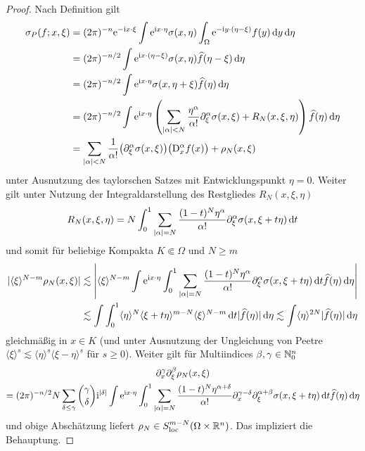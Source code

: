 \begin{proof}
Nach Definition gilt
\begin{align}
   \sigma_P(f;x,\xi) &=(2\pi)^{-n}  \mathrm e^{-\mathrm i x\cdot\xi} \int \mathrm e^{\mathrm i x\cdot\eta} \sigma(x,\eta) \int_\Omega \mathrm e^{-\mathrm i y\cdot(\eta-\xi)} f(y) \,\mathrm d y \,\mathrm d\eta \notag\\
   & = (2\pi)^{-n/2}  \int \mathrm e^{\mathrm i x\cdot(\eta-\xi)} \sigma(x,\eta) \widehat f(\eta-\xi)\,\mathrm d\eta \notag\\
   & = (2\pi)^{-n/2}  \int \mathrm e^{\mathrm i x\cdot\eta} \sigma(x,\eta+\xi) \widehat f(\eta)\,\mathrm d\eta \notag\\
   & = (2\pi)^{-n/2}  \int \mathrm e^{\mathrm i x\cdot\eta} \left( \sum_{|\alpha|<N} \frac{\eta^\alpha}{\alpha!} \partial_\xi^\alpha \sigma(x,\xi) + R_N(x,\xi,\eta) \right) \widehat f(\eta)\,\mathrm d\eta \notag\\  
   & =  \sum_{|\alpha|<N} \frac{1}{\alpha!} \big( \partial_\xi^\alpha \sigma(x,\xi) \big) \big(\mathrm D_x^\alpha f(x)\big)  +
   \rho_N(x,\xi)
\end{align}
unter Ausnutzung des taylorschen Satzes mit Entwicklungspunkt $\eta=0$. Weiter gilt unter Nutzung der Integraldarstellung des Restgliedes $R_N(x,\xi,\eta)$ 
\begin{equation}
   R_N(x,\xi,\eta) = N \int_0^1 \sum_{|\alpha|=N} \frac{(1-t)^N \eta^\alpha}{\alpha!} \partial_\xi^\alpha \sigma(x,\xi+t\eta) \,\mathrm d t 
\end{equation}
und somit für beliebige Kompakta $K\Subset\Omega$ und $N\ge m$
\begin{align}
   |\langle\xi\rangle^{N-m} \rho_N(x,\xi)|& \lesssim 
   \left|\langle\xi\rangle^{N-m}  \int \mathrm e^{\mathrm i x\cdot\eta} \int_0^1 \sum_{|\alpha|=N} \frac{(1-t)^N \eta^\alpha}{\alpha!} \partial_\xi^\alpha \sigma(x,\xi+t\eta) \,\mathrm d t  \widehat f(\eta) \,\mathrm d\eta   \right| \notag\\
&\lesssim  \int \int_0^1 \langle\eta\rangle^N \langle\xi+t\eta\rangle^{m-N} \langle\xi\rangle^{N-m} \,\mathrm d t | \widehat f(\eta) |\,\mathrm d\eta   
\lesssim \int \langle\eta\rangle^{2N} |\widehat f(\eta)|\,\mathrm d\eta
\end{align}
gleichmäßig in $x\in K$ (und unter Ausnutzung der Ungleichung von Peetre $\langle \xi\rangle^s \lesssim \langle\eta\rangle^s \langle\xi-\eta\rangle^s$ für $s\ge0$).
Weiter gilt für Multiindices $\beta,\gamma\in\mathbb N_0^n$
\begin{multline}
   \partial_x^\gamma \partial_\xi^\beta \rho_N(x,\xi) \\
   =  (2\pi)^{-n/2} N \sum_{\delta\le\gamma} \binom{\gamma}{\delta} \mathrm i^{|\delta|} \int \mathrm e^{\mathrm i x\cdot\eta} \int_0^1 \sum_{|\alpha|=N} \frac{(1-t)^N \eta^{\alpha+\delta}}{\alpha!} \partial_x^{\gamma-\delta} \partial_\xi^{\alpha+\beta} \sigma(x,\xi+t\eta) \,\mathrm d t  \widehat f(\eta) \,\mathrm d\eta 
\end{multline}
und obige Abschätzung liefert $\rho_N\in S^{m-N}_{\rm loc}(\Omega\times\mathbb R^n)$. Das impliziert die Behauptung.
\end{proof}

